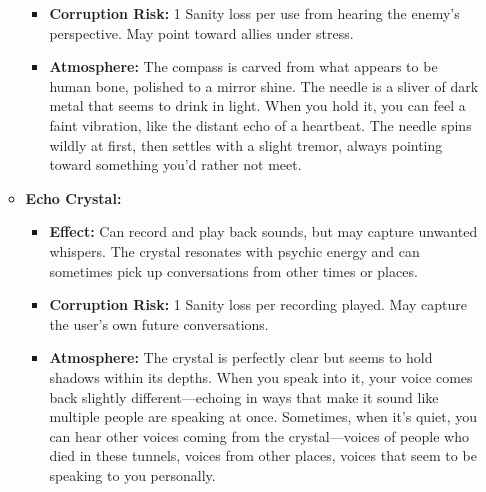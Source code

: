 \documentclass[11pt]{article}
\begin{document}
\begin{itemize}
\begin{itemize}
\begin{itemize}
  \item \textbf{Corruption Risk:} 1 Sanity loss per use from hearing the enemy's perspective. May point toward allies under stress.
  \item \textbf{Atmosphere:} The compass is carved from what appears to be human bone, polished to a mirror shine. The needle is a sliver of dark metal that seems to drink in light. When you hold it, you can feel a faint vibration, like the distant echo of a heartbeat. The needle spins wildly at first, then settles with a slight tremor, always pointing toward something you'd rather not meet.
  \end{itemize}
\item \textbf{Echo Crystal:} 
  \begin{itemize}
  \item \textbf{Effect:} Can record and play back sounds, but may capture unwanted whispers. The crystal resonates with psychic energy and can sometimes pick up conversations from other times or places.
  \item \textbf{Corruption Risk:} 1 Sanity loss per recording played. May capture the user's own future conversations.
  \item \textbf{Atmosphere:} The crystal is perfectly clear but seems to hold shadows within its depths. When you speak into it, your voice comes back slightly different—echoing in ways that make it sound like multiple people are speaking at once. Sometimes, when it's quiet, you can hear other voices coming from the crystal—voices of people who died in these tunnels, voices from other places, voices that seem to be speaking to you personally.
  \end{itemize}
\end{itemize}


\end{itemize}
\end{document}
